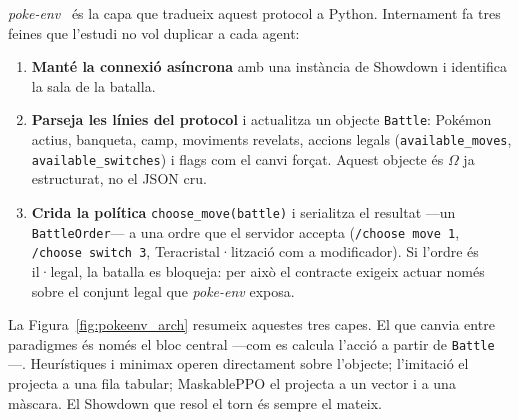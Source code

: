 \textit{poke-env}~\cite{poke_env} és la capa que tradueix aquest protocol a Python. Internament fa tres feines que l'estudi no vol duplicar a cada agent:

\begin{enumerate}
    \item \textbf{Manté la connexió asíncrona} amb una instància de Showdown i identifica la sala de la batalla.
    \item \textbf{Parseja les línies del protocol} i actualitza un objecte \texttt{Battle}: Pokémon actius, banqueta, camp, moviments revelats, accions legals (\texttt{available\_moves}, \texttt{available\_switches}) i flags com el canvi forçat. Aquest objecte és $\Omega$ ja estructurat, no el JSON cru.
    \item \textbf{Crida la política} \texttt{choose\_move(battle)} i serialitza el resultat ---un \texttt{BattleOrder}--- a una ordre que el servidor accepta (\texttt{/choose move 1}, \texttt{/choose switch 3}, Teracristal·lització com a modificador). Si l'ordre és il·legal, la batalla es bloqueja: per això el contracte exigeix actuar només sobre el conjunt legal que \textit{poke-env} exposa.
\end{enumerate}

La Figura~\ref{fig:pokeenv_arch} resumeix aquestes tres capes. El que canvia entre paradigmes és només el bloc central ---com es calcula l'acció a partir de \texttt{Battle}---. Heurístiques i minimax operen directament sobre l'objecte; l'imitació el projecta a una fila tabular; MaskablePPO el projecta a un vector i a una màscara. El Showdown que resol el torn és sempre el mateix.

